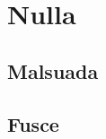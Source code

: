 \chapter{Nulla}
\label{chap2}


\section{Malsuada}
\label{chap2_sec1}

	
\lipsum[8-9]



\section{Fusce}
\label{chap2_sec2}

\lipsum[10-11]